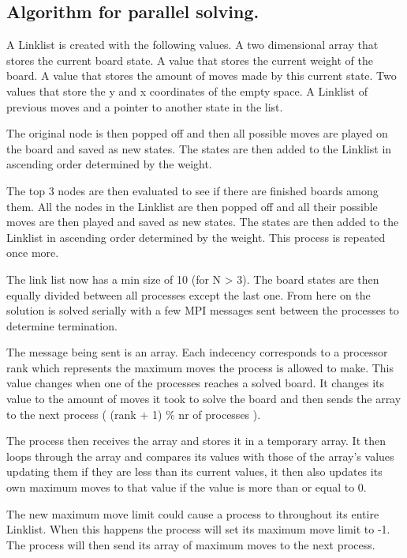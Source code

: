 \documentclass{article}
\begin{document}
	\subsection{Algorithm for parallel solving.}

	A Linklist is created with the following values. A two dimensional array
	that stores the current board state. A value that stores the current weight
	of the board. A value that stores the amount of moves made by this current 
	state. Two values that store the y and x coordinates of the empty space. A
	Linklist of previous moves and a pointer to another state in the list.

	The original node is then popped off and then all possible moves are played
	on the board and saved as new states. The states are then added to the
	Linklist in ascending order determined by the weight.

	The top 3 nodes are then evaluated to see if there are finished boards among
	them. All the nodes in the Linklist are then popped off and all their
	possible moves are then played and saved as new states. The states are then
	added to the Linklist in ascending order determined by the weight. This
	process is repeated once more.

	The link list now has a min size of 10 (for N > 3). The board states are
	then equally divided between all processes except the last one. From here on
	the solution is solved serially with a few MPI messages sent between the
	processes to determine termination.

	The message being sent is an array. Each indecency corresponds to a
	processor rank which represents the maximum moves the process is allowed to
	make. This value changes when one of the processes reaches a solved board. 
	It changes its value to the amount of moves it took to solve the board and
	then sends the array to the next process ( (rank + 1) \% nr of processes ).

	The process then receives the array and stores it in a temporary array. It 
	then loops through the array and compares its values with those of the 
	array’s values updating them if they are less than its current values, it 
	then also updates its own maximum moves to that value if the value is more 
	than or equal to 0.

	The new maximum move limit could cause a process to throughout its entire
	Linklist. When this happens the process will set its maximum move limit to
	-1. The process will then send its array of maximum moves to the next
	process.
\end{document}
